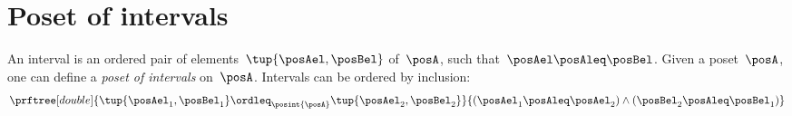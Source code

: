 \section{Poset of intervals}
\begin{definition}
  \label{def:poset_intervals}
  An interval is an ordered pair of elements~$\tup{\posAel,\posBel}$ of~$\posA$, such that~$\posAel \posAleq \posBel$. Given a poset~$\posA$, one can define a \emph{poset of intervals} on~$\posA$.
  Intervals can be ordered by inclusion:
  \begin{equation}
    \prftree[double]{\tup{\posAel_1,\posBel_1}\ordleq_{\posint{\posA}}\tup{\posAel_2,\posBel_2} }{ (\posAel_1\posAleq \posAel_2)\wedge (\posBel_2\posAleq \posBel_1)}
  \end{equation}
\end{definition}